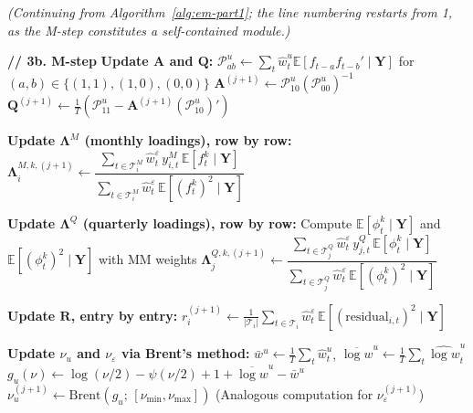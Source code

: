 \documentclass[11pt, a4paper, oneside]{article}
\newcommand{\mL}{\boldsymbol{\Lambda}}
\begin{document}
\begin{algorithm}[H]
\caption{EM algorithm for the Student-$t$ DFM (Part 2 of 2): M-step, Convergence Check, and Post-processing}
\label{alg:em-part2}
\small
\begin{algorithmic}[1]

\Statex \emph{(Continuing from Algorithm~\ref{alg:em-part1}; the line numbering restarts from 1, as the M-step constitutes a self-contained module.)}

\vspace{0.2em}
\State \textbf{// 3b. M-step}
\State \textbf{Update $\mathbf{A}$ and $\mathbf{Q}$:}
\Statex \quad $\mathcal{P}^u_{ab} \gets \sum_t \hat{w}^u_t \mathbb{E}[f_{t-a} f_{t-b}' \mid \mathbf{Y}]$ for $(a,b) \in \{(1,1),(1,0),(0,0)\}$
\Statex \quad $\mathbf{A}^{(j+1)} \gets \mathcal{P}^u_{10} (\mathcal{P}^u_{00})^{-1}$
\Statex \quad $\mathbf{Q}^{(j+1)} \gets \tfrac{1}{T}(\mathcal{P}^u_{11} - \mathbf{A}^{(j+1)} (\mathcal{P}^u_{10})')$

\vspace{0.2em}
\State \textbf{Update $\mL^M$ (monthly loadings), row by row:}
    \State $\mL^{M,k,(j+1)}_i \gets \dfrac{\sum_{t \in \mathcal{T}^M_i} \hat{w}^\varepsilon_t\, y^M_{i,t}\, \mathbb{E}[f^k_t \mid \mathbf{Y}]}{\sum_{t \in \mathcal{T}^M_i} \hat{w}^\varepsilon_t\, \mathbb{E}[(f^k_t)^2 \mid \mathbf{Y}]}$
\EndFor

\vspace{0.2em}
\State \textbf{Update $\mL^Q$ (quarterly loadings), row by row:}
    \State Compute $\mathbb{E}[\phi^k_t \mid \mathbf{Y}]$ and $\mathbb{E}[(\phi^k_t)^2 \mid \mathbf{Y}]$ with MM weights
    \State $\mL^{Q,k,(j+1)}_j \gets \dfrac{\sum_{t \in \mathcal{T}^Q_j} \hat{w}^\varepsilon_t\, y^Q_{j,t}\, \mathbb{E}[\phi^k_t \mid \mathbf{Y}]}{\sum_{t \in \mathcal{T}^Q_j} \hat{w}^\varepsilon_t\, \mathbb{E}[(\phi^k_t)^2 \mid \mathbf{Y}]}$
\EndFor

\vspace{0.2em}
\State \textbf{Update $\mathbf{R}$, entry by entry:}
    \State $r^{(j+1)}_i \gets \tfrac{1}{|\mathcal{T}_i|} \sum_{t \in \mathcal{T}_i} \hat{w}^\varepsilon_t\, \mathbb{E}[(\text{residual}_{i,t})^2 \mid \mathbf{Y}]$
\EndFor

\vspace{0.2em}
\State \textbf{Update $\nu_u$ and $\nu_\varepsilon$ via Brent's method:}
\State $\bar{w}^u \gets \tfrac{1}{T}\sum_t \hat{w}^u_t$, \;$\overline{\log w}^u \gets \tfrac{1}{T}\sum_t \widehat{\log w}^u_t$
\State $g_u(\nu) \gets \log(\nu/2) - \psi(\nu/2) + 1 + \overline{\log w}^u - \bar{w}^u$
\State $\nu_u^{(j+1)} \gets \text{Brent}(g_u;\, [\nu_{\min}, \nu_{\max}])$
\State (Analogous computation for $\nu_\varepsilon^{(j+1)}$)


\end{algorithmic}
\end{algorithm}
\end{document}
